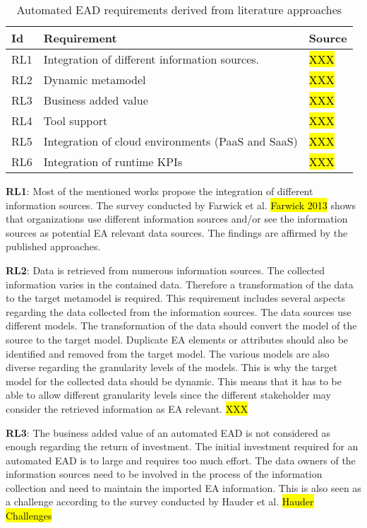 \begin{table}[htpb]
  \caption[Automated EAD requirements derived from literature approaches]{Automated EAD requirements derived from literature approaches}\label{tab:sample}
  \centering
  \begin{tabular}{l l l}
    \toprule
      Id & Requirement & Source\\
    \midrule
      RL1 & Integration of different information sources. & \hl{XXX}\\
      RL2 & Dynamic metamodel & \hl{XXX}\\
      RL3 & Business added value & \hl{XXX}\\
      RL4 & Tool support & \hl{XXX}\\
      RL5 & Integration of cloud environments (PaaS and SaaS) & \hl{XXX}\\
      RL6 & Integration of runtime KPIs & \hl{XXX}\\
    \bottomrule
  \end{tabular}
\end{table}

\textbf{RL1}: Most of the mentioned works propose the integration of different information sources. The survey conducted by Farwick et al. \hl{Farwick 2013} shows that organizations use different information sources and/or see the information sources as potential EA relevant data sources. The findings are affirmed by the published approaches.

\textbf{RL2}: Data is retrieved from numerous information sources. The collected information varies in the contained data. Therefore a transformation of the data to the target metamodel is required. This requirement includes several aspects regarding the data collected from the information sources. The data sources use different models. The transformation of the data should convert the model of the source to the target model. Duplicate EA elements or attributes should also be identified and removed from the target model. The various models are also diverse regarding the granularity levels of the models. This is why the target model for the collected data should be dynamic. This means that it has to be able to allow different granularity levels since the different stakeholder may consider the retrieved information as EA relevant. \hl{XXX}

\textbf{RL3}: The business added value of an automated EAD is not considered as enough regarding the return of investment. The initial investment required for an automated EAD is to large and requires too much effort. The data owners of the information sources need to be involved in the process of the information collection and need to maintain the imported EA information. This is also seen as a challenge according to the survey conducted by Hauder et al. \hl{Hauder Challenges}

